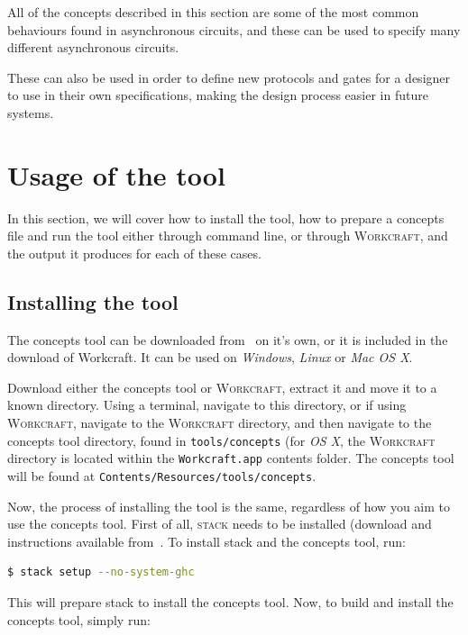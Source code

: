 \documentclass[british,conference,compsoc]{IEEEtran}
\newcommand{\noun}[1]{\textsc{#1}}
\begin{document}
\noindent All of the concepts described in this section are some of the most
common behaviours found in asynchronous circuits, and these can be used
to specify many different asynchronous circuits. 

These can also be used in order to define new protocols and gates for a designer
to use in their own specifications, making the design process easier in future 
systems. 

\section{Usage of the tool\label{sec:tool-use}}

In this section, we will cover how to install the tool, how to prepare a
concepts file and  run the tool either through command line, or through 
\noun{Workcraft}, and the output it produces for each of these cases.

\subsection{Installing the tool}

The concepts tool can be downloaded from~\cite{2016_concepts_github} on it's
own, or it is included in the download of Workcraft. It can be used on 
\emph{Windows}, \emph{Linux} or \emph{Mac OS X}.

Download either the concepts tool or \noun{Workcraft}, extract it and move it to
a known directory. Using a terminal, navigate to this directory,
or if using \noun{Workcraft}, navigate to the \noun{Workcraft} directory, and
then navigate to the concepts tool directory, found in \texttt{tools/concepts} 
(for \emph{OS X}, the \noun{Workcraft} directory is located within the 
\texttt{Workcraft.app} contents folder. The concepts tool will be found at 
\texttt{Contents/Resources/tools/concepts}.

Now, the process of installing the tool is the same, regardless of how you aim 
to use the concepts tool. First of all,  \noun{stack} needs to be installed 
(download and instructions available from~\cite{stack_website}. 
To install stack and the concepts tool, run: 

\begin{lstlisting}[language=bash]
  $ stack setup --no-system-ghc
\end{lstlisting}

This will prepare stack to install the concepts tool. Now, to build and install
the concepts tool, simply run:
\end{document}
